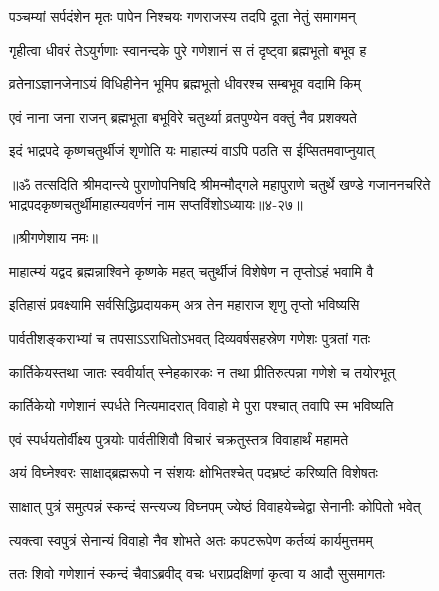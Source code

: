 \twolineshloka
{पञ्चम्यां सर्पदंशेन मृतः पापेन निश्चयः}
{गणराजस्य तदपि दूता नेतुं समागमन्} %

\twolineshloka
{गृहीत्वा धीवरं तेऽयुर्गणाः स्वानन्दके पुरे}
{गणेशानं स तं दृष्ट्वा ब्रह्मभूतो बभूव ह} %

\twolineshloka
{व्रतेनाऽज्ञानजेनाऽयं विधिहीनेन भूमिप}
{ब्रह्मभूतो धीवरश्च सम्बभूव वदामि किम्} %

\twolineshloka
{एवं नाना जना राजन् ब्रह्मभूता बभूविरे}
{चतुर्थ्या व्रतपुण्येन वक्तुं नैव प्रशक्यते} %

\twolineshloka
{इदं भाद्रपदे कृष्णचतुर्थीजं श‍ृणोति यः}
{माहात्म्यं वाऽपि पठति स ईप्सितमवाप्नुयात्} %

॥ॐ तत्सदिति श्रीमदान्त्ये पुराणोपनिषदि श्रीमन्मौद्गले महापुराणे चतुर्थे खण्डे गजाननचरिते भाद्रपदकृष्णचतुर्थीमाहात्म्यवर्णनं नाम सप्तविंशोऽध्यायः॥४-२७॥


\label{sec:ashvina-krishna-chaturthi-mahatmya-varnanam}

\centerline{॥श्रीगणेशाय नमः॥}


\twolineshloka
{माहात्म्यं यद्वद ब्रह्मन्नाश्विने कृष्णके महत्}
{चतुर्थीजं विशेषेण न तृप्तोऽहं भवामि वै} %


\twolineshloka
{इतिहासं प्रवक्ष्यामि सर्वसिद्धिप्रदायकम्}
{अत्र तेन महाराज श‍ृणु तृप्तो भविष्यसि} %

\twolineshloka
{पार्वतीशङ्कराभ्यां च तपसाऽऽराधितोऽभवत्}
{दिव्यवर्षसहस्रेण गणेशः पुत्रतां गतः} %

\twolineshloka
{कार्तिकेयस्तथा जातः स्ववीर्यात् स्नेहकारकः}
{न तथा प्रीतिरुत्पन्ना गणेशे च तयोरभूत्} %

\twolineshloka
{कार्तिकेयो गणेशानं स्पर्धते नित्यमादरात्}
{विवाहो मे पुरा पश्चात् तवापि स्म भविष्यति} %

\twolineshloka
{एवं स्पर्धयतोर्वीक्ष्य पुत्रयोः पार्वतीशिवौ}
{विचारं चक्रतुस्तत्र विवाहार्थं महामते} %

\twolineshloka
{अयं विघ्नेश्वरः साक्षाद्ब्रह्मरूपो न संशयः}
{क्षोभितश्चेत् पदभ्रष्टं करिष्यति विशेषतः} %

\twolineshloka
{साक्षात् पुत्रं समुत्पन्नं स्कन्दं सन्त्यज्य विघ्नपम्}
{ज्येष्ठं विवाहयेच्चेद्वा सेनानीः कोपितो भवेत्} %

\twolineshloka
{त्यक्त्वा स्वपुत्रं सेनान्यं विवाहो नैव शोभते}
{अतः कपटरूपेण कर्तव्यं कार्यमुत्तमम्} %

\twolineshloka
{ततः शिवो गणेशानं स्कन्दं चैवाऽब्रवीद् वचः}
{धराप्रदक्षिणां कृत्वा य आदौ सुसमागतः} %

